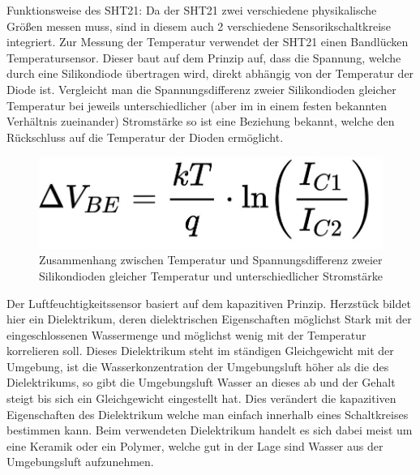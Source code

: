 \documentclass[]{article}
\begin{document}
		Funktionsweise des SHT21:
		Da der SHT21 zwei verschiedene physikalische Größen messen muss, sind in diesem auch 2 verschiedene Sensorikschaltkreise integriert. Zur Messung der Temperatur verwendet der SHT21 einen Bandlücken Temperatursensor. Dieser baut auf dem Prinzip auf, dass die Spannung, welche durch eine Silikondiode übertragen wird, direkt abhängig von der Temperatur der Diode ist. Vergleicht man die Spannungsdifferenz zweier Silikondioden gleicher Temperatur bei jeweils unterschiedlicher (aber im in einem festen bekannten Verhältnis zueinander) Stromstärke so ist eine Beziehung bekannt, welche den Rückschluss auf die Temperatur der Dioden ermöglicht.
		\begin{figure}[!h]
			\centering
			\includegraphics[scale=0.2]{images/Temperatursensorformel}
			\caption{Zusammenhang zwischen Temperatur und Spannungsdifferenz zweier Silikondioden gleicher Temperatur und unterschiedlicher Stromstärke\cite{tempsensor}}
			\label{img:temperatursensor}
		\end{figure}
		
		Der Luftfeuchtigkeitssensor basiert auf dem kapazitiven Prinzip. Herzstück bildet hier ein Dielektrikum, deren dielektrischen Eigenschaften möglichst Stark mit der eingeschlossenen Wassermenge und möglichst wenig mit der Temperatur korrelieren soll. Dieses Dielektrikum steht im ständigen Gleichgewicht mit der Umgebung, ist die Wasserkonzentration der Umgebungsluft höher als die des Dielektrikums, so gibt die Umgebungsluft Wasser an dieses ab und der Gehalt steigt bis sich ein Gleichgewicht eingestellt hat. Dies verändert die kapazitiven Eigenschaften des Dielektrikum welche man einfach innerhalb eines Schaltkreises bestimmen kann. Beim verwendeten Dielektrikum handelt es sich dabei meist um eine Keramik oder ein Polymer, welche gut in der Lage sind Wasser aus der Umgebungsluft aufzunehmen. \cite{rhsensor}
		
\end{document}
